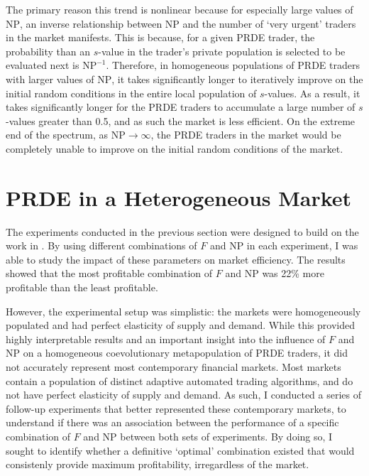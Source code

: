 \documentclass[conference]{IEEEtran}
\begin{document}
The primary reason this trend is nonlinear because for especially large values of $\mathrm{NP}$, an inverse relationship between $\mathrm{NP}$ and the number of `very urgent' traders in the market manifests.
This is because, for a given PRDE trader, the probability than an $s$-value in the trader's private population is selected to be evaluated next is $\mathrm{NP}^{-1}$.
Therefore, in homogeneous populations of PRDE traders with larger values of $\mathrm{NP}$, it takes significantly longer to iteratively improve on the initial random conditions in the entire local population of $s$-values.
As a result, it takes significantly longer for the PRDE traders to accumulate a large number of $s$-values greater than 0.5, and as such the market is less efficient.
On the extreme end of the spectrum, as $\mathrm{NP}\to\infty$, the PRDE traders in the market would be completely unable to improve on the initial random conditions of the market.

\section{PRDE in a Heterogeneous Market}

The experiments conducted in the previous section were designed to build on the work in \cite{PRDE}.
By using different combinations of $F$ and $\mathrm{NP}$ in each experiment, I was able to study the impact of these parameters on market efficiency.
The results showed that the most profitable combination of $F$ and $\mathrm{NP}$ was 22\% more profitable than the least profitable.

However, the experimental setup was simplistic: the markets were homogeneously populated and had perfect elasticity of supply and demand.
While this provided highly interpretable results and an important insight into the influence of $F$ and $\mathrm{NP}$ on a homogeneous coevolutionary metapopulation of PRDE traders, it did not accurately represent most contemporary financial markets.
Most markets contain a population of distinct adaptive automated trading algorithms, and do not have perfect elasticity of supply and demand.
As such, I conducted a series of follow-up experiments that better represented these contemporary markets, to understand if there was an association between the performance of a specific combination of $F$ and $\mathrm{NP}$ between both sets of experiments.
By doing so, I sought to identify whether a definitive `optimal' combination existed that would consistenly provide maximum profitability, irregardless of the market.
\end{document}
